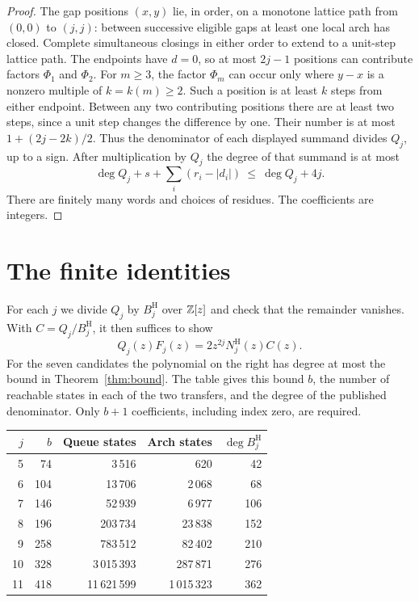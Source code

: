 \begin{proof}
The gap positions \((x,y)\) lie, in order, on a monotone lattice path from \((0,0)\) to \((j,j)\): between successive eligible gaps at least one local arch has closed. Complete simultaneous closings in either order to extend to a unit-step lattice path. The endpoints have \(d=0\), so at most \(2j-1\) positions can contribute factors \(\Phi_1\) and \(\Phi_2\). For \(m\ge3\), the factor \(\Phi_m\) can occur only where \(y-x\) is a nonzero multiple of \(k=k(m)\ge2\). Such a position is at least \(k\) steps from either endpoint. Between any two contributing positions there are at least two steps, since a unit step changes the difference by one. Their number is at most \(1+(2j-2k)/2\). Thus the denominator of each displayed summand divides \(Q_j\), up to a sign. After multiplication by \(Q_j\) the degree of that summand is at most
\[
 \deg Q_j+s+\sum_i(r_i-|d_i|)\ \le\ \deg Q_j+4j.
\]
There are finitely many words and choices of residues. The coefficients are integers.
\end{proof}

\section{The finite identities}
For each \(j\) we divide \(Q_j\) by \(B_j^{\mathrm H}\) over \(\mathbb Z[z]\) and check that the remainder vanishes. With \(C=Q_j/B_j^{\mathrm H}\), it then suffices to show
\[
 Q_j(z)F_j(z)=2z^{2j}N_j^{\mathrm H}(z)C(z).
\]
For the seven candidates the polynomial on the right has degree at most the bound in Theorem~\ref{thm:bound}. The table gives this bound \(b\), the number of reachable states in each of the two transfers, and the degree of the published denominator. Only \(b+1\) coefficients, including index zero, are required.

\begin{center}
\begin{tabular}{rrrrr}\toprule
\(j\)&\(b\)&Queue states&Arch states&\(\deg B_j^{\mathrm H}\)\\\midrule
5 & 74 & 3\,516 & 620 & 42\\
6 & 104 & 13\,706 & 2\,068 & 68\\
7 & 146 & 52\,939 & 6\,977 & 106\\
8 & 196 & 203\,734 & 23\,838 & 152\\
9 & 258 & 783\,512 & 82\,402 & 210\\
10 & 328 & 3\,015\,393 & 287\,871 & 276\\
11 & 418 & 11\,621\,599 & 1\,015\,323 & 362\\
\bottomrule\end{tabular}
\end{center}

